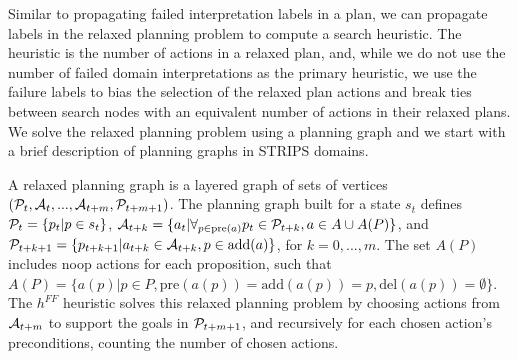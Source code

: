 \documentclass{article}
\def\citep#1{\cite{#1}}
\def\und#1{\noindent{\bf #1}:}
\def\und#1{\medskip{\noindent\bf #1:}}
\begin{document}
Similar to propagating failed interpretation labels in a plan, we can propagate labels in the relaxed planning problem to compute a search heuristic.  The heuristic is the number of actions in a relaxed plan, and, while we do not use the number of failed domain interpretations as the primary heuristic, we use the failure labels to bias the selection of the relaxed plan actions and break ties between search nodes with an equivalent number of actions in their relaxed plans.  We solve the relaxed planning problem using a planning graph and we start with a brief description of planning graphs in STRIPS domains.

\und{Planning Graph Heuristics}   A relaxed planning graph  is a layered graph of sets of vertices $({\cal P}_t, {\cal A}_t, ..., {\cal A}_{t+m}, {\cal P}_{t+m+1})$.  The planning graph built for a state $s_t$ defines ${\cal P}_t = \{p_t | p \in s_t\}$, ${\cal A}_{t+k} = \{ a_t | \forall_{ p \in \text{pre}(a)} p_t \in {\cal P}_{t+k}, a \in A \cup A(P)\}$, and ${\cal P}_{t+k+1} = \{p_{t+k+1} | a_{t+k} \in {\cal A}_{t+k}, p \in \text{add}(a)\}$, for $k = 0, ..., m$.  The set $A(P)$ includes noop actions for each proposition, such that $A(P) = \{a(p) | p \in P, \text{pre}(a(p)) =\text{add}(a(p))=p, \text{del}(a(p))=\emptyset\}$.
The $h^{FF}$  heuristic \citep{hoffmann:nebel:jair-01} solves this relaxed planning problem by choosing actions from ${\cal A}_{t+m}$ to support the goals in ${\cal P}_{t+m+1}$, and recursively for each chosen action's preconditions, counting the number of chosen actions.

\end{document}
